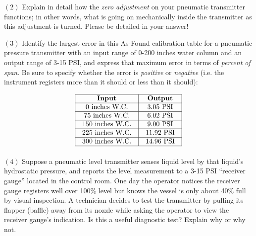\item{$(2)$} Explain in detail how the {\it zero adjustment} on your pneumatic transmitter functions; in other words, what is going on mechanically inside the transmitter as this adjustment is turned.  Please be detailed in your answer!

\vskip 20pt

\item{$(3)$} Identify the largest error in this As-Found calibration table for a pneumatic pressure transmitter with an input range of 0-200 inches water column and an output range of 3-15 PSI, and express that maximum error in terms of {\it percent of span}.  Be sure to specify whether the error is {\it positive} or {\it negative} (i.e. the instrument registers more than it should or less than it should):


$$\vbox{\offinterlineskip
\halign{\strut
\vrule \quad\hfil # \ \hfil & 
\vrule \quad\hfil # \ \hfil \vrule \cr
\noalign{\hrule}
%
{\bf Input} & {\bf Output} \cr
%
\noalign{\hrule}
%
0 inches W.C. & 3.05 PSI \cr
%
\noalign{\hrule}
%
75 inches W.C. & 6.02 PSI \cr
%
\noalign{\hrule}
%
150 inches W.C. & 9.00 PSI \cr
%
\noalign{\hrule}
%
225 inches W.C. & 11.92 PSI \cr
%
\noalign{\hrule}
%
300 inches W.C. & 14.96 PSI \cr
%
\noalign{\hrule}
} %
}$$ %

\vskip 20pt

\item{$(4)$} Suppose a pneumatic level transmitter senses liquid level by that liquid's hydrostatic pressure, and reports the level measurement to a 3-15 PSI ``receiver gauge'' located in the control room.  One day the operator notices the receiver gauge registers well over 100\% level but knows the vessel is only about 40\% full by visual inspection.  A technician decides to test the transmitter by pulling its flapper (baffle) away from its nozzle while asking the operator to view the receiver gauge's indication.  Is this a useful diagnostic test?  Explain why or why not.


















